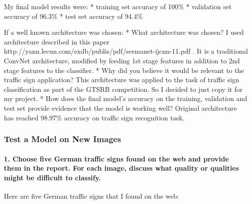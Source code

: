 \documentclass[11pt]{article}
\begin{document}
My final model results were: * training set accuracy of 100\% *
validation set accuracy of 96.3\% * test set accuracy of 94.4\%

If a well known architecture was chosen: * What architecture was chosen?
I used architecture described in this paper
http://yann.lecun.com/exdb/publis/pdf/sermanet-ijcnn-11.pdf . It is a
traditional ConvNet architecture, modified by feeding 1st stage features
in addition to 2nd stage features to the classifier. * Why did you
believe it would be relevant to the traffic sign application? This
architecture was applied to the task of traffic sign classification as
part of the GTSRB competition. So I decided to just copy it for my
project. * How does the final model's accuracy on the training,
validation and test set provide evidence that the model is working well?
Original architecture has reached 98.97\% accuracy on traffic sign
recognition task.

    \hypertarget{test-a-model-on-new-images}{%
\subsubsection{Test a Model on New
Images}\label{test-a-model-on-new-images}}

\hypertarget{choose-five-german-traffic-signs-found-on-the-web-and-provide-them-in-the-report.-for-each-image-discuss-what-quality-or-qualities-might-be-difficult-to-classify.}{%
\paragraph{1. Choose five German traffic signs found on the web and
provide them in the report. For each image, discuss what quality or
qualities might be difficult to
classify.}\label{choose-five-german-traffic-signs-found-on-the-web-and-provide-them-in-the-report.-for-each-image-discuss-what-quality-or-qualities-might-be-difficult-to-classify.}}

Here are five German traffic signs that I found on the web:
\end{document}
